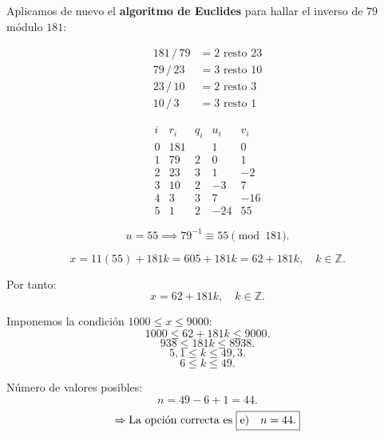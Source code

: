 \documentclass[a4paper,12pt]{article}
\begin{document}
\begin{ejercicioExamen}[title=Ejercicio 3]

Aplicamos de nuevo el \textbf{algoritmo de Euclides} para hallar el inverso de \(79\) módulo \(181\):

\[
\begin{aligned}
    181\,/\,79 &= 2 \text{ resto } 23 \\
    79\,/\,23 &= 3 \text{ resto } 10 \\
    23\,/\,10 &= 2 \text{ resto } 3 \\
    10\,/\,3 &= 3 \text{ resto } \boxed{1}
\end{aligned}
\]

\[
\begin{array}{c|c|c|c|c}
i & r_i & q_i & u_i & v_i \\ \hline
0 & 181 &  & 1 & 0 \\
1 & 79 & 2 & 0 & 1 \\
2 & 23 & 3 & 1 & -2 \\
3 & 10 & 2 & -3 & 7 \\
4 & 3 & 3 & 7 & -16 \\
5 & \boxed{1} & 2 & -24 & 55
\end{array}
\]

\[
u = 55 \implies 79^{-1} \equiv 55 \pmod{181}.
\]

\[
x = 11(55) + 181k = 605 + 181k = 62 + 181k, \quad k \in \mathbb{Z}.
\]

Por tanto:
\[
x = 62 + 181k, \quad k \in \mathbb{Z}.
\]

\medskip
Imponemos la condición \(1000 \le x \le 9000\):
\[
1000 \le 62 + 181k \le 9000.
\]
\[
938 \le 181k \le 8938.
\]
\[
5{,}1 \le k \le 49{,}3.
\]
\[
6 \le k \le 49.
\]

Número de valores posibles:
\[
n = 49 - 6 + 1 = 44.
\]
\[
\Rightarrow \text{La opción correcta es } \boxed{$e)$\quad n=44.}
\]

\end{ejercicioExamen}
\end{document}
